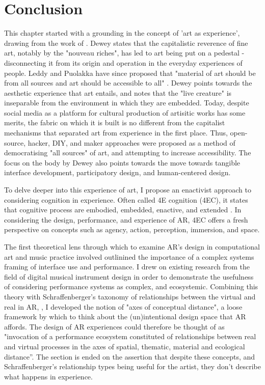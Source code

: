 \section{Conclusion}\label{sec: theory-conclusion}
This chapter started with a grounding in the concept of 'art as experience', drawing from the work of \citep{dewey1934}. Dewey states that the capitalistic reverence of fine art, notably by the "nouveau riches", has led to art being put on a pedestal - disconnecting it from its origin and operation in the everyday experiences of people. Leddy and Puolakka have since proposed that "material of art should be from all sources and art should be accessible to all" \citeyearpar{leddy2021}. Dewey points towards the aesthetic experience that art entails, and notes that the "live creature" is inseparable from the environment in which they are embedded. Today, despite social media as a platform for cultural production of artisitic works has some merits, the fabric on which it is built is no different from the capitalist mechanisms that separated art from experience in the first place. Thus, open-source, hacker, DIY, and maker approaches were proposed as a method of democratising "all sources" of art, and attempting to increase accessibility. The focus on the body by Dewey also points towards the move towards tangible interface development, participatory design, and human-centered design.

To delve deeper into this experience of art, I propose an enactivist approach to considering cognition in experience. Often called 4E cognition (4EC), it states that cognitive process are embodied, embedded, enactive, and extended \citep{gallagher2017}. In considering the design, performance, and experience of AR, 4EC offers a fresh perspective on concepts such as agency, action, perception, immersion, and space.

The first theoretical lens through which to examine AR's design in computational art and music practice involved outlinined the importance of a complex systems framing of interface use and performance. I drew on existing research from the field of digital musical instrument design \citep{magnusson2009a,discipio2003,essl2006,armstrong2006,hayes2019,chevalier2018} in order to demonstrate the usefulness of considering performance systems as complex, and ecosystemic. Combining this theory with Schraffenberger's taxonomy of relationships between the virtual and real in AR, \citeyearpar{schraffenberger2018}, I developed the notion of "axes of conceptual distance", a loose framework by which to think about the (un)intentional design space that AR affords. The design of AR experiences could therefore be thought of as "invocation of a performance ecosystem constituted of relationships between real and virtual processes in the axes of spatial, thematic, material and ecological distance”. The section is ended on the assertion that despite these concepts, and Schraffenberger's relationship types being useful for the artist, they don't describe what happens in experience.

